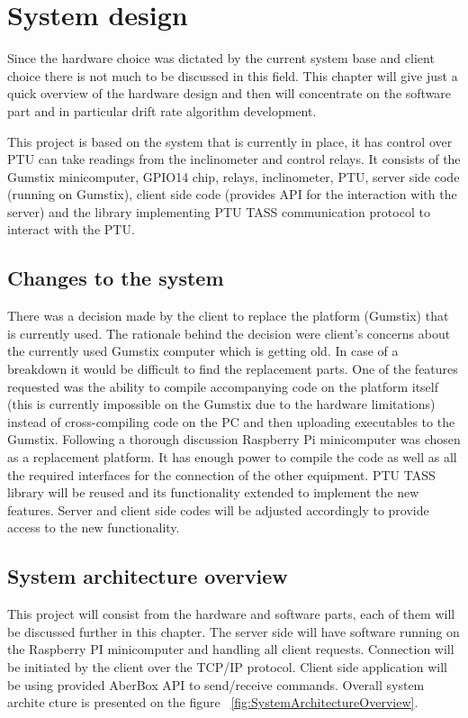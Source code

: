 \chapter{System design}
Since the hardware choice was dictated by the current system base and client choice there is not much to be discussed in this field. This chapter will give just a quick overview of the hardware design and then will concentrate on the software part and in particular drift rate algorithm development.

This project is based on the system that is currently in place, it has control over PTU can take readings from the inclinometer and control relays. It consists of the Gumstix minicomputer, GPIO14 chip, relays, inclinometer, PTU, server side code (running on Gumstix), client side code (provides API for the interaction with the server) and the library implementing PTU TASS communication protocol to interact with the PTU. 

\section{Changes to the system}
There was a decision made by the client to replace the platform (Gumstix) that is currently used. The rationale behind the decision were client's concerns about the currently used Gumstix computer which is getting old. In case of a breakdown it would be difficult to find the replacement parts. One of the features requested was the ability to compile accompanying code on the platform itself (this is currently impossible on the Gumstix due to the hardware limitations) instead of cross-compiling code on the PC and then uploading executables to the Gumstix. Following a thorough discussion Raspberry Pi minicomputer was chosen as a replacement platform. It has enough power to compile the code as well as all the required interfaces for the connection of the other equipment. PTU TASS library will be reused and its functionality extended to implement the new features. Server and client side codes will be adjusted accordingly to provide access to the new functionality.

\section{System architecture overview}
This project will consist from the hardware and software parts, each of them will be discussed further in this chapter. The server side will have software running on the Raspberry PI minicomputer and handling all client requests. Connection will be initiated by the client over the TCP/IP protocol. Client side application will be using provided AberBox API to send/receive commands. Overall system archite cture is presented on the figure ~\ref{fig:SystemArchitectureOverview}.

